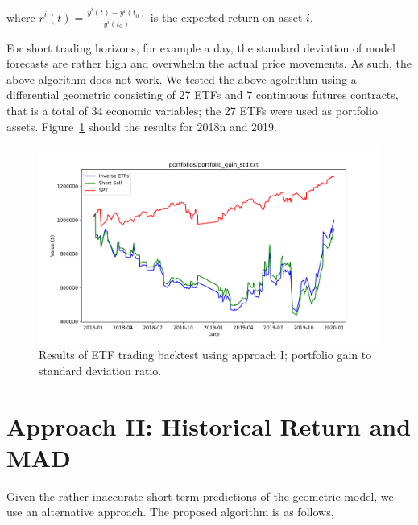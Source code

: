 \documentclass{article}
\begin{document}
where $r^{i}(t) = \frac{\bar{y}^{i}(t)-y^{i}(t_{0})}{y^{i}(t_{0})}$ is
the expected return on asset $i$.

For short trading horizons, for example a day, the standard deviation
of model forecasts are rather high and overwhelm the actual price
movements. As such, the above algorithm does not work. We tested the
above agolrithm using a differential geometric consisting of 27 ETFs
and 7 continuous futures contracts, that is a total of 34 economic
variables; the 27 ETFs were used as portfolio
assets. Figure~\ref{fig:etf-results-approach-1} should the results for
2018n and 2019.

\begin{figure}
\includegraphics[scale=0.42,bb=0 0 320 240]{figures/Gain_std_maximization.png}
\caption{Results of ETF trading backtest using approach I; portfolio
  gain to standard deviation ratio.}
\label{fig:etf-results-approach-1}
\end{figure}

\section{Approach II: Historical Return and MAD}\label{section:approach-2}

Given the rather inaccurate short term predictions of the geometric
model, we use an alternative approach. The proposed algorithm is as
follows,
\end{document}
